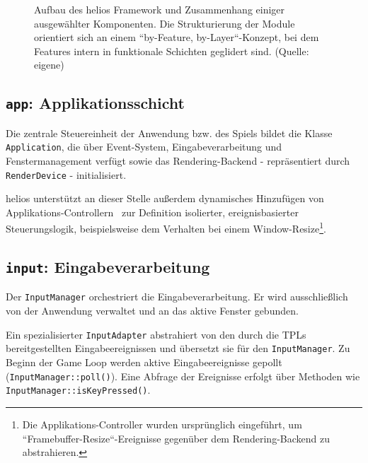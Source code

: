 \begin{figure}[t]
    \centering
    \caption{Aufbau des helios Framework und Zusammenhang einiger ausgewählter Komponenten. Die Strukturierung der Module orientiert sich an einem ``by-Feature, by-Layer``-Konzept, bei dem Features intern in funktionale Schichten geglidert sind. (Quelle: eigene)}

    \label{fig:package_diagram}

\end{figure}


\subsection*{\texttt{app}: Applikationsschicht}
Die zentrale Steuereinheit der Anwendung bzw. des Spiels bildet die Klasse \texttt{Application}, die über Event-System, Eingabeverarbeitung und Fenstermanagement verfügt sowie das Rendering-Backend - repräsentiert durch \texttt{RenderDevice} - initialisiert.\par
helios unterstützt an dieser Stelle außerdem dynamisches Hinzufügen von Applikations-Controllern~\cite[379]{Fow03} zur Definition isolierter, ereignisbasierter Steuerungslogik, beispielsweise dem Verhalten bei einem Window-Resize\footnote{
Die Applikations-Controller wurden ursprünglich eingeführt, um ``Framebuffer-Resize``-Ereignisse gegenüber dem Rendering-Backend zu abstrahieren.
}.

\subsection*{\texttt{input}: Eingabeverarbeitung}
Der \texttt{InputManager} orchestriert die Eingabeverarbeitung.
Er wird ausschließlich von der Anwendung verwaltet und an das aktive Fenster gebunden.\par
Ein spezialisierter \texttt{InputAdapter} abstrahiert von den durch die TPLs bereitgestellten Eingabeereignissen und übersetzt sie für den \texttt{InputManager}.
Zu Beginn der Game Loop werden aktive Eingabeereignisse gepollt (\texttt{InputManager::poll()}). Eine Abfrage der Ereignisse erfolgt über Methoden wie \texttt{InputManager::isKeyPressed()}.

